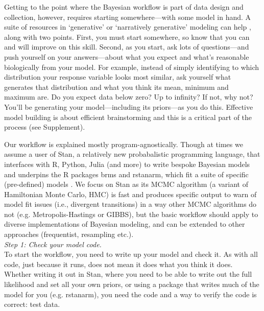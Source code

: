 \documentclass[11pt]{article}
\begin{document}
{Getting to the point where the Bayesian workflow is part of data design and collection, however, requires starting somewhere---with some model in hand. A suite of resources in `generative' or `narratively generative' modeling can help \citep{statrethink,betangen}, along with two points. First, you must start somewhere, so know that you can and will improve on this skill. Second, as you start, ask lots of questions---and push yourself on your answers---about what you expect and what's reasonable biologically from your model. For example, instead of simply identifying to which distribution your response variable looks most similar, ask yourself what generates that distribution and what you think its mean, minimum and maximum are. Do you expect data below zero? Up to infinity? If not, why not? You'll be generating your model---including its priors---as you do this. Effective model building is about efficient brainstorming and this is a critical part of the process (see Supplement). 

Our workflow is explained mostly program-agnostically. Though at times we assume a user of \textsf{Stan}, a relatively new probabalistic programming language, that interfaces with \textsf{R, Python, Julia} (and more) to write bespoke Bayesian models and underpins the \textsf{R} packages \textsf{brms} and \textsf{rstanarm}, which fit a suite of specific (pre-defined) models \citep{Carpenter:2017stan}. We focus on \textsf{Stan} as its MCMC algorithm (a variant of Hamiltonian Monte Carlo, HMC) is fast and produces specific output to warn of model fit issues (i.e., divergent transitions) in a way other MCMC algorithms do not (e.g. Metropolis-Hastings or GIBBS), but the basic workflow should apply to diverse implementations of Bayesian modeling, and can be extended to other approaches (frequentist, resampling etc.). \\

\emph{Step 1: Check your model code.} \\ 
To start the workflow, you need to write up your model and check it. As with all code, just because it runs, does not mean it does what you think it does. Whether writing it out in \textsf{Stan}, where you need to be able to write out the full likelihood and set all your own priors, or using a package that writes much of the model for you (e.g. \textsf{rstanarm}), you need the code and a way to verify the code is correct: test data.

}
\end{document}
